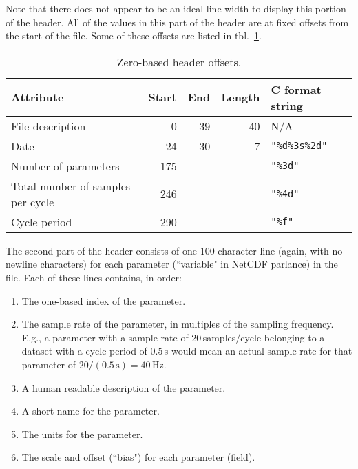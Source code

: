 \documentclass{report}
\begin{document}
Note that there does not appear to be an ideal line width to display this portion of the header. All of the values in this part of the header are at fixed offsets from the start of the file. Some of these offsets are listed in tbl.~\ref{Tbl.HeaderOffsets}.

\begin{table}[H]
\centering
\caption{Zero-based header offsets.}
\label{Tbl.HeaderOffsets}
\begin{tabular}{lrrrl}
Attribute                         & Start & End & Length & C format string \\
\hline
File description                  & 0     & 39  & 40     & N/A \\
Date                              & 24    & 30  & 7      & \texttt{"\%d\%3s\%2d"} \\
Number of parameters              & 175   &     &        & \texttt{"\%3d"} \\
Total number of samples per cycle & 246   &     &        & \texttt{"\%4d"} \\
Cycle period                      & 290   &     &        & \texttt{"\%f"}
\end{tabular}
\end{table}

The second part of the header consists of one 100 character line (again, with no newline characters) for each parameter (``variable" in NetCDF parlance) in the file. Each of these lines contains, in order:
\begin{enumerate}
	\item The one-based index of the parameter.
	\item The sample rate of the parameter, in multiples of the sampling
	      frequency. E.g., a parameter with a sample rate of
	      \(20\)\,samples/cycle belonging to a dataset with a cycle period
	      of \(0.5\)\,s would mean an actual
	      sample rate for that parameter of \(20/(0.5\,\mathrm{s}) = 40\,\text{Hz}\).
	\item A human readable description of the parameter.
	\item A short name for the parameter.
	\item The units for the parameter.
	\item The scale and offset (``bias") for each parameter (field).
\end{enumerate}
\end{document}
